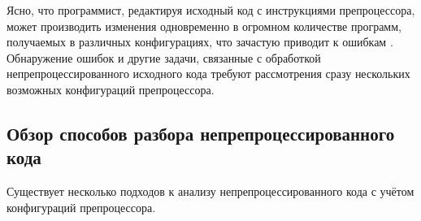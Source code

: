 Ясно, что программист, редактируя исходный код с инструкциями препроцессора, может производить изменения одновременно в огромном количестве программ, получаемых в различных конфигурациях, что зачастую приводит к ошибкам \cite{ribeiro}. Обнаружение ошибок и другие задачи, связанные с обработкой непрепроцессированного исходного кода требуют рассмотрения сразу нескольких возможных конфигураций препроцессора.

\subsection{Обзор способов разбора непрепроцессированного кода}
\label{subsec:unpreprocessed_parsing_methods}

Существует несколько подходов к анализу непрепроцессированного кода с учётом конфигураций препроцессора.

